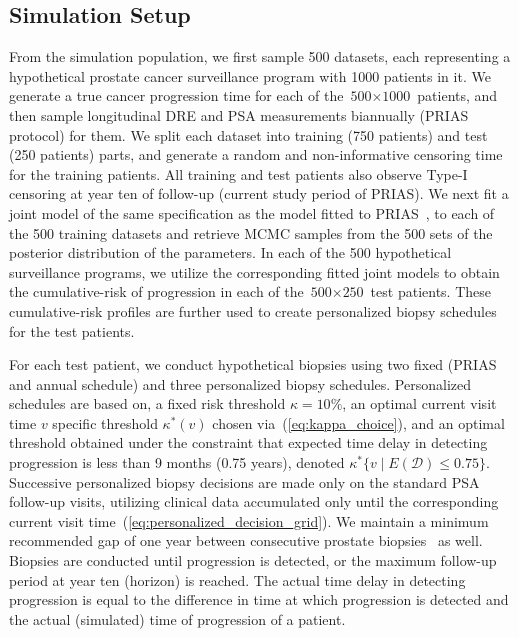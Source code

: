 \documentclass[useAMS, usenatbib, referee]{biom}
\begin{document}
\subsection{Simulation Setup}
From the simulation population, we first sample 500 datasets, each representing a hypothetical prostate cancer surveillance program with 1000 patients in it. We generate a true cancer progression time for each of the ${\mbox{500} \times \mbox{1000}}$ patients, and then sample longitudinal DRE and PSA measurements biannually (PRIAS protocol) for them. We split each dataset into training (750 patients) and test (250 patients) parts, and generate a random and non-informative censoring time for the training patients. All training and test patients also observe Type-I censoring at year ten of follow-up (current study period of PRIAS). We next fit a joint model of the same specification as the model fitted to PRIAS~\citep{tomer2019personalized}, to each of the 500 training datasets and retrieve MCMC samples from the 500 sets of the posterior distribution of the parameters. In each of the 500 hypothetical surveillance programs, we utilize the corresponding fitted joint models to obtain the cumulative-risk of progression in each of the ${\mbox{500} \times \mbox{250}}$ test patients. These cumulative-risk profiles are further used to create personalized biopsy schedules for the test patients. 

For each test patient, we conduct hypothetical biopsies using two fixed (PRIAS and annual schedule) and three personalized biopsy schedules. Personalized schedules are based on, a fixed risk threshold $\kappa=10\%$, an optimal current visit time $v$ specific threshold $\kappa^*(v)$ chosen via~(\ref{eq:kappa_choice}), and an optimal threshold obtained under the constraint that expected time delay in detecting progression is less than 9 months (0.75 years), denoted $\kappa^*\{v \mid E(\mathcal{D})\leq 0.75\}$. Successive personalized biopsy decisions are made only on the standard PSA follow-up visits, utilizing clinical data accumulated only until the corresponding current visit time~(\ref{eq:personalized_decision_grid}). We maintain a minimum recommended gap of one year between consecutive prostate biopsies~\citep{bokhorst2015compliance} as well. Biopsies are conducted until progression is detected, or the maximum follow-up period at year ten (horizon) is reached. The actual time delay in detecting progression is equal to the difference in time at which progression is detected and the actual (simulated) time of progression of a patient.
\end{document}
